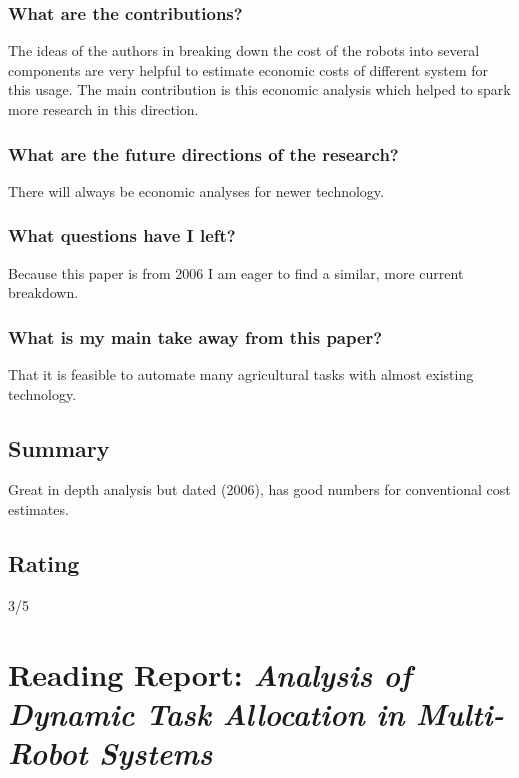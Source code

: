     \subsubsection*{What are the contributions?}
    The ideas of the authors in breaking down the cost of the robots into several components are very helpful to estimate economic costs of different system for
    this usage. The main contribution is this economic analysis which helped to spark more research in this direction.
    \subsubsection*{What are the future directions of the research?}
    There will always be economic analyses for newer technology.  
    \subsubsection*{What questions have I left?}
    Because this paper is from 2006 I am eager to find a similar, more current breakdown.
    \subsubsection*{What is my main take away from this paper?}
    That it is feasible to automate many agricultural tasks with almost existing technology.
    
    \subsection*{Summary}
    Great in depth analysis but dated (2006), has good numbers for conventional cost estimates.
    \subsection*{Rating}
    3/5
    
    \newpage
    \section{Reading Report: \emph{Analysis of Dynamic Task Allocation in Multi-Robot Systems
    }}
    \cite{Lerman2006}
    
